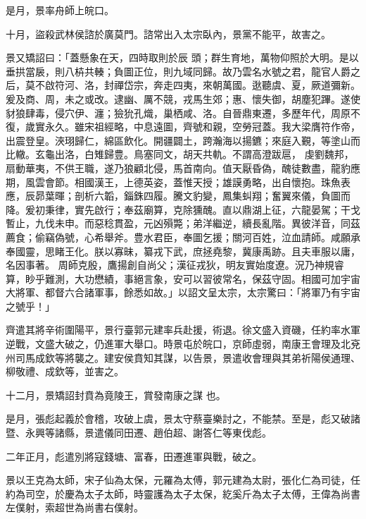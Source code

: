 \begin{pinyinscope}
 是月，景率舟師上皖口。



 十月，盜殺武林侯諮於廣莫門。諮常出入太宗臥內，景黨不能平，故害之。



 景又矯詔曰：「蓋懸象在天，四時取則於辰
 頭；群生育地，萬物仰照於大明。是以垂拱當扆，則八枿共輳；負圖正位，則九域同歸。故乃雲名水號之君，龍官人爵之后，莫不啟符河、洛，封禪岱宗，奔走四夷，來朝萬國。逖聽虞、夏，厥道彌新。爰及商、周，未之或改。逮幽、厲不競，戎馬生郊；惠、懷失御，胡塵犯蹕。遂使豺狼肆毒，侵穴伊、瀍；獫狁孔熾，巢栖咸、洛。自晉鼎東遷，多歷年代，周原不復，歲實永久。雖宋祖經略，中息遠圖，齊號和親，空勞冠蓋。我大梁膺符作帝，出震登皇。浹珝歸仁，綿區飲化。開疆闢土，跨瀚海以揚鑣；來庭入覲，等塗山而比轍。玄龜出洛，白雉歸豊。鳥塞同文，胡天共軌。不謂高澄跋扈，
 虔劉魏邦，扇動華夷，不供王職，遂乃狼顧北侵，馬首南向。值天厭昏偽，醜徒數盡，龍豹應期，風雲會節。相國漢王，上德英姿，蓋惟天授；雄謨勇略，出自懷抱。珠魚表應，辰昴葉暉；剖析六韜，錙銖四履。騰文豹變，鳳集虯翔；奮翼來儀，負圖而降。爰初秉律，實先啟行；奉茲廟算，克除獯醜。直以鼎湖上征，六龍晏駕；干戈暫止，九伐未申。而惡稔貫盈，元凶殞斃；弟洋繼逆，續長亂階。異彼洋音，同茲薦食；偷竊偽號，心希舉斧。豊水君臣，奉圖乞援；關河百姓，泣血請師。咸願承奉國靈，思睹王化。朕以寡昧，纂戎下武，庶拯堯黎，冀康禹跡。且夫車服以庸，名因事著。
 周師克殷，鷹揚創自尚父；漢征戎狄，明友實始度遼。況乃神規睿算，眇乎難測，大功懋績，事絕言象，安可以習彼常名，保茲守固。相國可加宇宙大將軍、都督六合諸軍事，餘悉如故。」以詔文呈太宗，太宗驚曰：「將軍乃有宇宙之號乎！」



 齊遣其將辛術圍陽平，景行臺郭元建率兵赴援，術退。徐文盛入資磯，任約率水軍逆戰，文盛大破之，仍進軍大舉口。時景屯於皖口，京師虛弱，南康王會理及北兗州司馬成欽等將襲之。建安侯賁知其謀，以告景，景遣收會理與其弟祈陽侯通理、柳敬禮、成欽等，並害之。



 十二月，景矯詔封賁為竟陵王，賞發南康之謀
 也。



 是月，張彪起義於會稽，攻破上虞，景太守蔡臺樂討之，不能禁。至是，彪又破諸暨、永興等諸縣，景遣儀同田遷、趙伯超、謝答仁等東伐彪。



 二年正月，彪遣別將寇錢塘、富春，田遷進軍與戰，破之。



 景以王克為太師，宋子仙為太保，元羅為太傅，郭元建為太尉，張化仁為司徒，任約為司空，於慶為太子太師，時靈護為太子太保，紇奚斤為太子太傅，王偉為尚書左僕射，索超世為尚書右僕射。




\end{pinyinscope}
